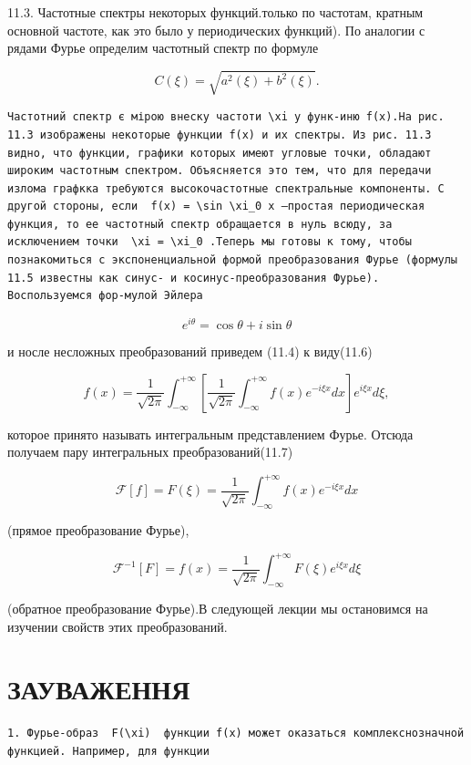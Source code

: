 \documentclass[
  ukrainian,
]{article}
\begin{document}
11.3. Частотные спектры некоторых функций.только по частотам, кратным
основной частоте, как это было у периодических функций). По аналогии с
рядами Фурье определим частотный спектр по формуле

\[
C(\xi) = \sqrt{a^2(\xi) + b^2(\xi)}.
\]

\begin{verbatim}
Частотний спектр є мірою внеску частоти \xi у функ-иню f(x).На рис. 11.3 изображены некоторые функции f(x) и их спектры. Из рис. 11.3 видно, что функции, графики которых имеют угловые точки, обладают широким частотным спектром. Объясняется это тем, что для передачи излома графкка требуются высокочастотные спектральные компоненты. С другой стороны, если  f(x) = \sin \xi_0 x —простая периодическая функция, то ее частотный спектр обращается в нуль всюду, за исключением точки  \xi = \xi_0 .Теперь мы готовы к тому, чтобы познакомиться с экспоненциальной формой преобразования Фурье (формулы 11.5 известны как синус- и косинус-преобразования Фурье). Воспользуемся фор-мулой Эйлера
\end{verbatim}

\[
e^{i\theta} = \cos \theta + i \sin \theta
\]

и носле несложных преобразований приведем (11.4) к виду(11.6)

\[
f(x) = \frac{1}{\sqrt{2\pi}} \int_{-\infty}^{+\infty} \left[ \frac{1}{\sqrt{2\pi}} \int_{-\infty}^{+\infty} f(x) e^{-i\xi x} dx \right] e^{i\xi x} d\xi,
\]

которое принято называть интегральным представлением Фурье. Отсюда
получаем пару интегральных преобразований(11.7)

\[
\mathcal{F}[f] = F(\xi) = \frac{1}{\sqrt{2\pi}} \int_{-\infty}^{+\infty} f(x) e^{-i\xi x} dx
\]

(прямое преобразование Фурье),

\[
\mathcal{F}^{-1}[F] = f(x) = \frac{1}{\sqrt{2\pi}} \int_{-\infty}^{+\infty} F(\xi) e^{i\xi x} d\xi
\]

(обратное преобразование Фурье).В следующей лекции мы остановимся на
изучении свойств этих преобразований.

\section{ЗАУВАЖЕННЯ}\label{ux437ux430ux443ux432ux430ux436ux435ux43dux43dux44f}

\begin{verbatim}
1. Фурье-образ  F(\xi)  функции f(x) может оказаться комплекснозначной функцией. Например, для функции
\end{verbatim}
\end{document}
